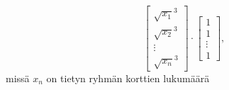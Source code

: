 \[ \begin{bmatrix}\sqrt{x_1}^3 \\ \sqrt{x_2}^3 \\ \vdots \\ \sqrt{x_n}^3\end{bmatrix} \cdot \begin{bmatrix}1 \\ 1 \\ \vdots \\ 1\end{bmatrix}, \]
\centering
missä $x_n$ on tietyn ryhmän korttien lukumäärä
